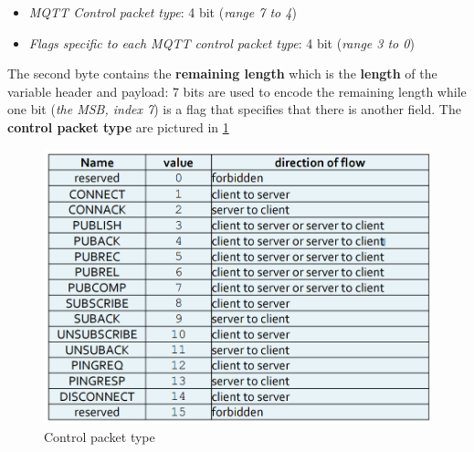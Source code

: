 \documentclass[10pt,a4paper]{report}
\theoremstyle{definition}
\begin{document}
\begin{itemize}
	\item 
	\textit{MQTT Control packet type}: 4 bit (\textit{range 7 to 4})
	\item 
	\textit{Flags specific to each MQTT control packet type}: 4 bit (\textit{range 3 to 0})

\end{itemize}
The second byte contains the \textbf{remaining length} which is the \textbf{length} of the variable header and payload: 7 bits are used to encode the remaining length while one bit (\textit{the MSB, index 7}) is a flag that specifies that there is another field.
The \textbf{control packet type} are pictured in \ref{mqtt-control-packet-type}
\begin{figure}
	\centering\includegraphics[scale=0.30]{images/Pasted image 20230304102050.png}
	\caption{Control packet type}\label{mqtt-control-packet-type}\end{figure}
\end{document}
